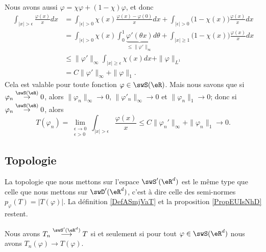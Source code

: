 \begin{example}
    Nous avons aussi \( \varphi=\chi\varphi+(1-\chi)\varphi\), et donc
    \begin{subequations}
        \begin{align}
            \int_{| x |>\epsilon}\frac{ \varphi(x) }{ x }dx&=\int_{| \epsilon |>0}\chi(x)\frac{ \varphi(x)-\varphi(0) }{ x }dx+\int_{| \epsilon |>0}\big( 1-\chi(x) \big)\frac{ \varphi(x) }{ x }dx\\
            &=\int_{| \epsilon |>0}\chi(x)\int_0^1\underbrace{\varphi'(\theta x)}_{\leq \| \varphi' \|_{\infty}}d\theta+\int_{| x |\geq 1}\big( 1-\chi(x) \big)\frac{ \varphi(x) }{ x }dx\\
            &\leq\| \varphi' \|_{\infty}\int_{| x |\geq \epsilon}\chi(x)dx+\| \varphi \|_{L^1}\\
            &=C\| \varphi' \|_{\infty}+\| \varphi \|_{1}.
        \end{align}
    \end{subequations}
    Cela est valable pour toute fonction \( \varphi\in\swS(\eR)\). Mais nous savons que si \( \varphi_n\stackrel{\swS(\eR)}{\to}0\), alors \( \| \varphi_n \|_{\infty}\to 0\), \( \| \varphi'_n \|_{\infty}\to 0\) et \( \| \varphi_n \|_1\to 0\); donc si \( \varphi_n\stackrel{\swS(\eR)}{\to}0\), alors
    \begin{equation}
        T(\varphi_n)=\lim_{\substack{\epsilon\to 0\\\epsilon>0}}\int_{| x |>\epsilon}\frac{ \varphi(x) }{ x }\leq C\| \varphi_n' \|_{\infty}+\| \varphi_n \|_1\to 0.
    \end{equation}
\end{example}

\subsection{Topologie}

La topologie que nous mettons sur l'espace \( \swS'(\eR^d)\) est le même type que celle que nous mettons sur \( \swD'(\eR^d)\), c'est à dire celle des semi-normes \( p_{\varphi}(T)=| T(\varphi) |\). La définition \ref{DefASmjVaT} et la proposition \ref{PropEUIsNhD} restent.

\begin{proposition} \label{PropQAuJstI}
    Nous avons \( T_n\stackrel{\swS'(\eR^d)}{\longrightarrow}T\) si et seulement si pour tout \( \varphi\in\swS(\eR^d)\) nous avons \( T_n(\varphi)\to T(\varphi)\).
\end{proposition}

